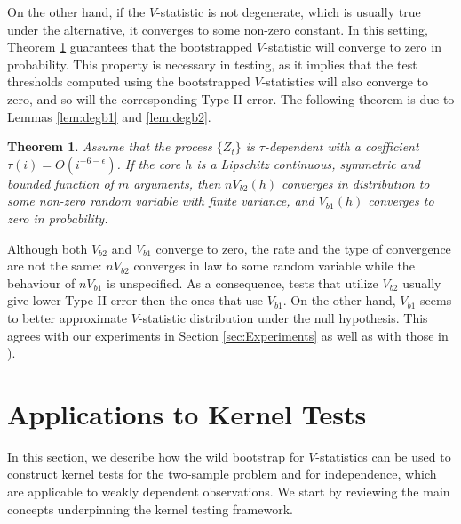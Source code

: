 \documentclass{article} %
\newtheorem{Theorem}{Theorem}
\begin{document}
On the other hand, if the $V$-statistic is not degenerate, which is usually true under the alternative, it converges to some non-zero constant. In this setting, Theorem \ref{th:mainTwo} guarantees that the bootstrapped $V$-statistic will converge to zero in probability. This property is necessary in testing, as it implies that the test thresholds computed using the bootstrapped $V$-statistics will also converge to zero, and so will the corresponding Type II error.    The following theorem is due to Lemmas \ref{lem:degb1} and \ref{lem:degb2}.
\begin{Theorem}
\label{th:mainTwo}
Assume that the process $\{Z_t\}$ is $\tau$-dependent with a coefficient $\tau(i) = O(i^{-6-\epsilon})$. If the core $h$ is  a Lipschitz continuous, symmetric and bounded function of $m$ arguments,  then $n V_{b2}(h)$ converges in distribution to some non-zero random variable with finite variance, and $V_{b1}(h)$  converges to zero in probability. 
\end{Theorem}
Although both $V_{b2}$ and $V_{b1}$  converge to zero, the rate and the type of convergence are not the same: $n V_{b2}$ converges in law to some random variable while the behaviour of $n V_{b1}$ is unspecified. As a consequence, tests that utilize $V_{b2}$ usually give lower Type II error then the ones that use $V_{b1}$. On the other hand, $V_{b1}$ seems to better approximate $V$-statistic distribution under the null hypothesis. This agrees with our experiments in Section \ref{sec:Experiments} as well as with those in \cite[Section 5]{leucht_dependent_2013}).  

\vspace{-3mm}
\section{Applications to Kernel Tests}\label{sec:mmd_hsic}
\vspace{-3mm}
In this section, we describe how the wild bootstrap for $V$-statistics can be used to construct kernel tests for the two-sample problem and for independence, which are applicable to weakly dependent observations. We start by reviewing the main concepts underpinning the kernel testing framework.
\end{document}
